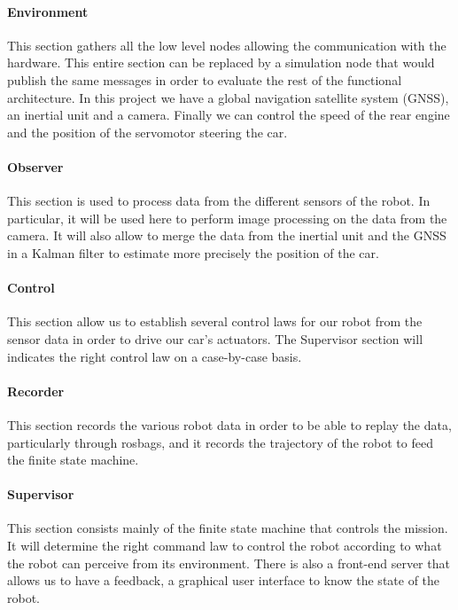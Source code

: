 \paragraph{Environment} This section gathers all the low level nodes allowing the 
communication with the hardware. This entire section can be replaced by a simulation
node that would publish the same messages in order to evaluate the rest of the 
functional architecture. In this project we have a global navigation satellite system
(GNSS), an inertial unit and a camera. Finally we can control the speed of the rear
engine and the position of the servomotor steering the car.

\paragraph{Observer} This section is used to process data from the different sensors of
the robot. In particular, it will be used here to perform image processing on the data
from the camera. It will also allow to merge the data from the inertial unit and the GNSS
in a Kalman filter to estimate more precisely the position of the car.

\paragraph{Control} This section allow us to establish several control laws for our robot
from the sensor data in order to drive our car's actuators. The Supervisor section will
indicates the right control law on a case-by-case basis.

\paragraph{Recorder} This section records the various robot data in order to be able to 
replay the data, particularly through rosbags, and it records the trajectory of the robot
to feed the finite state machine.

\paragraph{Supervisor} This section consists mainly of the finite state machine that controls
the mission. It will determine the right command law to control the robot according to what the
robot can perceive from its environment. There is also a front-end server that allows us to have
a feedback, a graphical user interface to know the state of the robot.

\newpage
